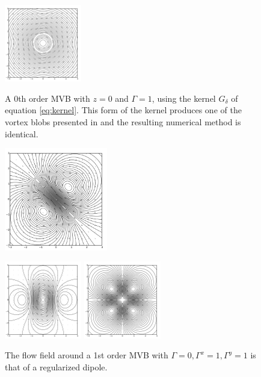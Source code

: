 \documentclass[12pt]{amsart}
\theoremstyle{remark}
\begin{document}
\begin{figure}[p] %
   \centering
	\includegraphics[clip,trim=0.6in 0.5in 0.6in 0.6in,width=0.3\textwidth]{./images/zero.pdf} 
	\caption{
		A 0th order MVB with $z = 0$ and $\Gamma=1$, using the kernel $G_\delta$ of equation \eqref{eq:kernel}.
		This form of the kernel produces one of the vortex blobs presented in\cite{BealeMajda1985}
		and the resulting numerical method is identical.}
	\label{fig:zero}
	\includegraphics[clip,trim=0.6in 0.5in 0.6in 0.6in,width=0.4\textwidth]{./images/one.pdf} 
	\caption{The flow field around a 1st order MVB with $\Gamma = 0,\Gamma^x = 1,\Gamma^y=1$ is that of a regularized dipole.}
	\label{fig:one}
	\includegraphics[clip,trim =1in 1in 1in 1in,width=0.3\textwidth]{./images/two_xx.pdf} 
	\includegraphics[clip,trim =1in 1in 1in 1in,width=0.3\textwidth]{./images/two_xy.pdf} 

\end{figure}
\end{document}
